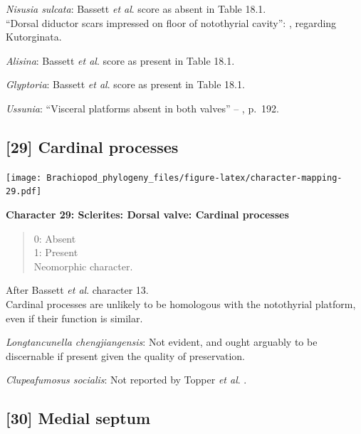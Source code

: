 \documentclass[]{book}
\theoremstyle{definition}
\theoremstyle{definition}
\theoremstyle{definition}
\theoremstyle{remark}
\begin{document}
\emph{Nisusia sulcata}: Bassett \emph{et al}.
\citeyearpar{Bassett2001Functionalmorphology} score as absent in Table
18.1.\\
``Dorsal diductor scars impressed on floor of notothyrial cavity'':
\citet{Williams2000BrachiopodaLinguliformea}, regarding Kutorginata.

\emph{Alisina}: Bassett \emph{et al}.
\citeyearpar{Bassett2001Functionalmorphology} score as present in Table
18.1.

\emph{Glyptoria}: Bassett \emph{et al}.
\citeyearpar{Bassett2001Functionalmorphology} score as present in Table
18.1.

\emph{Ussunia}: ``Visceral platforms absent in both valves'' --
\citet{Williams2000BrachiopodaLinguliformea}, p.~192.

\hypertarget{cardinal-processes}{%
\subsection*{{[}29{]} Cardinal processes}\label{cardinal-processes}}

\texttt{[image: Brachiopod\_phylogeny\_files/figure-latex/character-mapping-29.pdf]}

\textbf{Character 29: Sclerites: Dorsal valve: Cardinal processes}

\begin{quote}
0: Absent\\
1: Present\\
Neomorphic character.
\end{quote}

After Bassett \emph{et al}.
\citeyearpar{Bassett2001Functionalmorphology} character 13.\\
Cardinal processes are unlikely to be homologous with the notothyrial
platform, even if their function is similar.

\emph{Longtancunella chengjiangensis}: Not evident, and ought arguably
to be discernable if present given the quality of preservation.

\emph{Clupeafumosus socialis}: Not reported by Topper \emph{et al}.
\citeyearpar{Topper2013Reappraisalof}.

\hypertarget{medial-septum}{%
\subsection*{{[}30{]} Medial septum}\label{medial-septum}}
\end{document}
